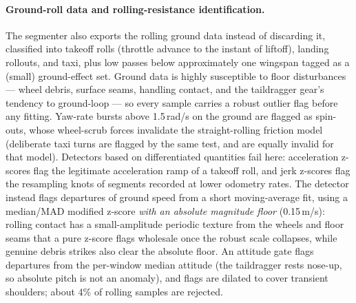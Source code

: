 \documentclass[11pt]{article}
\begin{document}
\paragraph{Ground-roll data and rolling-resistance identification.}
The segmenter also exports the rolling ground data instead of discarding it,
classified into takeoff rolls (throttle advance to the instant of liftoff),
landing rollouts, and taxi, plus low passes below approximately one wingspan
tagged as a (small) ground-effect set. Ground data is highly susceptible to
floor disturbances — wheel debris, surface seams, handling contact, and the
taildragger gear's tendency to ground-loop — so every
sample carries a robust outlier flag before any fitting. Yaw-rate bursts above
1.5\,rad/s on the ground are flagged as spin-outs, whose wheel-scrub forces
invalidate the straight-rolling friction model (deliberate taxi turns are
flagged by the same test, and are equally invalid for that model). Detectors based on
differentiated quantities fail here: acceleration z-scores flag the legitimate
acceleration ramp of a takeoff roll, and jerk z-scores flag the resampling
knots of segments recorded at lower odometry rates. The detector instead
flags departures of ground speed from a short moving-average fit, using a
median/MAD modified z-score \emph{with an absolute magnitude floor}
(0.15\,m/s): rolling contact has a small-amplitude periodic texture from the
wheels and floor seams that a pure z-score flags wholesale once the robust
scale collapses, while genuine debris strikes also clear the absolute floor.
An attitude gate flags departures from the per-window median attitude (the
taildragger rests nose-up, so absolute pitch is not an anomaly), and flags are
dilated to cover transient shoulders; about 4\% of rolling samples are
rejected.
\end{document}
